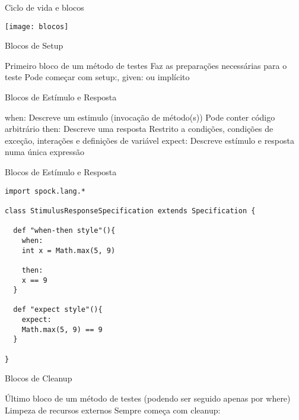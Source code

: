 \documentclass{beamer}
\begin{document}
\begin{frame}{Ciclo de vida e blocos}
  \begin{center}
    \texttt{[image: blocos]}
  \end{center}
\end{frame}

\begin{frame}{Blocos de Setup}
 \begin{outline}
    Primeiro bloco de um método de testes
    Faz as preparações necessárias para o teste
    Pode começar com \alert{setup:}, \alert{given:} ou implícito
 \end{outline}
\end{frame}

\begin{frame}{Blocos de Estímulo e Resposta}
 \begin{outline}
    \alert{when:}
     Descreve um estimulo (invocação de método(s))
     Pode conter código arbitrário
    \alert{then:}
     Descreve uma resposta
     Restrito a condições, condições de exceção, interações e definições de variável
    \alert{expect:}
     Descreve estímulo e resposta numa única expressão
  \0
  \0
 \end{outline}
\end{frame}

\begin{frame}[fragile]{Blocos de Estímulo e Resposta}
 \begin{verbatim}
import spock.lang.*

class StimulusResponseSpecification extends Specification {

  def "when-then style"(){
    when:
    int x = Math.max(5, 9)
    
    then:
    x == 9
  }
  
  def "expect style"(){
    expect:
    Math.max(5, 9) == 9
  }
  
}
  \end{verbatim}
\end{frame}

\begin{frame}{Blocos de Cleanup}
 \begin{outline}
    Último bloco de um método de testes (podendo ser seguido apenas por where)
    Limpeza de recursos externos
    Sempre começa com \alert{cleanup:}
 \end{outline}
\end{frame}
\end{document}
